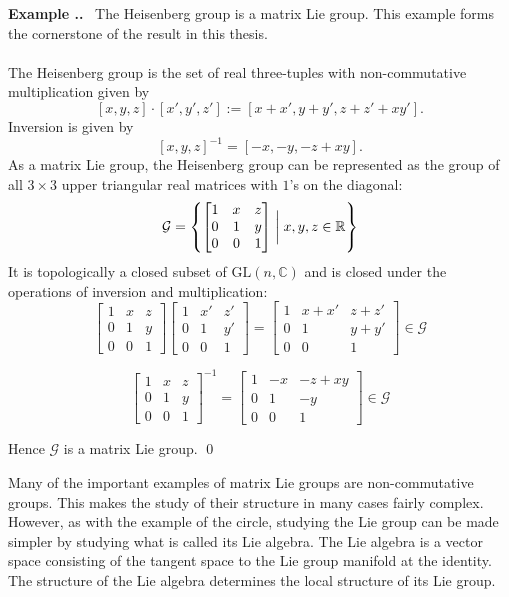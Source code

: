 \documentclass[honours]{UNSWthesis}
\newcommand{\R}{\mathbb{R}}
\newcommand{\C}{\mathbb{C}}
\newcommand{\G}{\mathcal{G}}
\newcommand{\1}{\mathbf{e}_{1}}
\newcommand{\2}{\mathbf{e}_{3}}
\newcommand{\3}{\mathbf{e}_{3}}
\newcounter{Item}[section]
\newenvironment{Example}{\medskip
                            \refstepcounter{Item}
                            \noindent
                           {\bf Example \thesection.\theItem.}\ }
                           {\qed}
\begin{document}
\begin{Example}\label{Heisenberg Group}
The Heisenberg group is a matrix Lie group. This example forms the cornerstone of the result in this thesis.
\paragraph
{\noindent}The Heisenberg group is the set of real three-tuples with non-commutative multiplication given by
\[
[x,y,z]\cdot[x', y', z'] := [x+x', y+y', z+z' + xy'].
\]
Inversion is given by 
\[ [x,y,z]^{-1}= [-x, -y, -z+xy] .\]
As a matrix Lie group, the Heisenberg group can be represented as the group of all $ 3\times 3 $ upper triangular real matrices with $1$'s on the diagonal:
\[
 \G= \left\{ \begin{bmatrix} 1 & x & z \\ 0 & 1 & y \\ 0 & 0 & 1 \end{bmatrix} \biggm| x,y, z \in \R \right\} 
\]
It is topologically a closed subset of $\mathrm{GL}(n,\C)$ and is closed under the operations of inversion and multiplication:
\[
\begin{bmatrix} 1 & x & z \\ 0 & 1 & y \\ 0 & 0 & 1 \end{bmatrix}
\begin{bmatrix} 1 & x' & z' \\ 0 & 1 & y' \\ 0 & 0 & 1 \end{bmatrix}
= \begin{bmatrix} 1 & x+x' & z+z' \\ 0 & 1 & y+y' \\ 0 & 0 & 1 \end{bmatrix}
\in \G
\] 

\[
\begin{bmatrix} 1 & x & z \\ 0 & 1 & y \\ 0 & 0 & 1 \end{bmatrix}^{-1}
= \begin{bmatrix} 1 & -x & -z+xy \\ 0 & 1 & -y \\ 0 & 0 & 1 \end{bmatrix}
\in \G
\]

Hence $\G$ is a matrix Lie group.
\end{Example}

Many of the important examples of matrix Lie groups are non-commutative groups. This makes the study of their structure in many 
cases fairly complex. However, as with the example of the circle, studying the Lie group can be made simpler by studying what is called its Lie algebra. The Lie algebra is a vector space consisting of the tangent space to the Lie group manifold at the identity. The structure of the Lie algebra determines the local structure of its Lie group.
\end{document}
